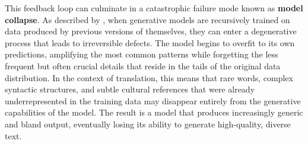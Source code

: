 \documentclass[11pt,a4paper]{article}
\begin{document}
This feedback loop can culminate in a catastrophic failure mode known as \textbf{model collapse}. As described by \citet{shumailov2024ai}, when generative models are recursively trained on data produced by previous versions of themselves, they can enter a degenerative process that leads to irreversible defects. The model begins to overfit to its own predictions, amplifying the most common patterns while forgetting the less frequent but often crucial details that reside in the tails of the original data distribution. In the context of translation, this means that rare words, complex syntactic structures, and subtle cultural references that were already underrepresented in the training data may disappear entirely from the generative capabilities of the model. The result is a model that produces increasingly generic and bland output, eventually losing its ability to generate high-quality, diverse text.
\end{document}
